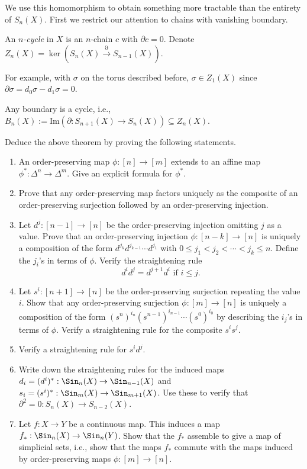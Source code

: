 We use this homomorphism to obtain something more tractable than the entirety of $S_n(X)$. First we restrict our attention to chains with vanishing boundary.
\begin{definition}
An \emph{$n$-cycle} in $X$ is an $n$-chain $c$ with $\partial c = 0$. Denote $Z_n(X) = \ker(S_n(X)\xrightarrow{\partial}S_{n-1}(X))$.
\end{definition}
For example, with $\sigma$ on the torus described before, $\sigma\in Z_1(X)$
since $\partial \sigma = d_0\sigma - d_1\sigma = 0$.
\begin{theorem}
    Any boundary is a cycle, i.e., $B_n(X) :=
    \mathrm{Im}(\partial:S_{n+1}(X)\to S_n(X))\subseteq Z_n(X)$.
\end{theorem}
\begin{exercise}\label{exer:simplicialidentities}
    Deduce the above theorem by proving the following statements.
    \begin{enumerate}
	\item An order-preserving map $\phi:[n]\to[m]$ extends to an affine map
	    $\phi^\ast:\Delta^n\to \Delta^m$. Give an explicit formula for
	    $\phi^\ast$.
	\item Prove that any order-preserving map factors uniquely as the
	    composite of an order-preserving surjection followed by an
	    order-preserving injection.
	\item Let $d^j:[n-1]\to [n]$ be the order-preserving injection omitting
	    $j$ as a value. Prove that an order-preserving injection
	    $\phi:[n-k]\to[n]$ is uniquely a composition of the form $d^{j_k}
	    d^{j_{k-1}}\cdots d^{j_1}$ with $0\leq j_1<j_2<\cdots<j_k\leq n$.
	    Define the $j_i$'s in terms of $\phi$. Verify the straightening
	    rule
	    $$d^id^j = d^{j+1} d^i \text{ if }i\leq j.$$
	\item Let $s^i:[n+1]\to [n]$ be the order-preserving surjection
	    repeating the value $i$. Show that any order-preserving surjection
	    $\phi:[m]\to [n]$ is uniquely a composition of the form
	    $(s^n)^{i_n}(s^{n-1})^{i_{n-1}}\cdots(s^0)^{i_0}$ by describing the
	    $i_j$'s in terms of $\phi$. Verify a straightening rule for the
	    composite $s^i s^j$.
	\item Verify a straightening rule for $s^i d^j$.
	\item Write down the straightening rules for the induced maps $d_i =
	    (d^i)^\ast:\Sin_n(X)\to \Sin_{n-1}(X)$ and $s_i =
	    (s^i)^\ast:\Sin_m(X)\to \Sin_{m+1}(X)$. Use these to verify that
	    $\partial^2 = 0:S_n(X)\to S_{n-2}(X)$.
	\item Let $f:X\to Y$ be a continuous map. This induces a map
	    $f_\ast:\Sin_n(X)\to \Sin_n(Y)$. Show that the $f_\ast$ assemble to
	    give a map of simplicial sets, i.e., show that the maps $f_\ast$
	    commute with the maps induced by order-preserving maps $\phi:[m]\to
	    [n]$.
    \end{enumerate}
\end{exercise}

